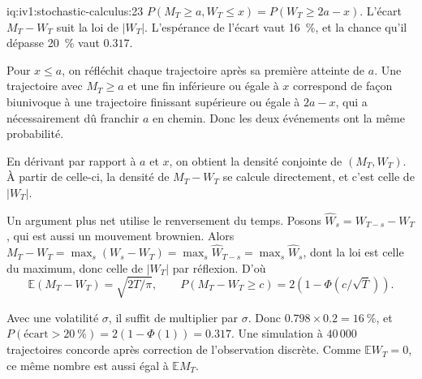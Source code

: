 \begin{solution}{iq:iv1:stochastic-calculus:23}
$P(M_T \ge a, W_T \le x) = P(W_T \ge 2a - x)$. L'écart $M_T - W_T$ suit la loi de $|W_T|$. L'espérance de l'écart vaut 16~\%, et la chance qu'il dépasse 20~\% vaut $0.317$.

Pour $x \le a$, on réfléchit chaque trajectoire après sa première atteinte de $a$. Une trajectoire avec $M_T \ge a$ et une fin inférieure ou égale à $x$ correspond de façon biunivoque à une trajectoire finissant supérieure ou égale à $2a - x$, qui a nécessairement dû franchir $a$ en chemin. Donc les deux événements ont la même probabilité.

En dérivant par rapport à $a$ et $x$, on obtient la densité conjointe de $(M_T, W_T)$. À partir de celle-ci, la densité de $M_T - W_T$ se calcule directement, et c'est celle de $|W_T|$.

Un argument plus net utilise le renversement du temps. Posons $\hat{W}_s = W_{T - s} - W_T$, qui est aussi un mouvement brownien. Alors $M_T - W_T = \max_s(W_s - W_T) = \max_s\hat{W}_{T - s} = \max_s\hat{W}_s$, dont la loi est celle du maximum, donc celle de $|W_T|$ par réflexion. D'où
\[
\mathbb{E}(M_T - W_T) = \sqrt{2T/\pi}, \qquad P(M_T - W_T \ge c) = 2(1 - \Phi(c/\sqrt{T})).
\]

Avec une volatilité $\sigma$, il suffit de multiplier par $\sigma$. Donc $0.798 \times 0.2 = 16~\%$, et $P(\text{écart} > 20~\%) = 2(1 - \Phi(1)) = 0.317$. Une simulation à $40\,000$ trajectoires concorde après correction de l'observation discrète. Comme $\mathbb{E}W_T = 0$, ce même nombre est aussi égal à $\mathbb{E}M_T$.



\end{solution}


